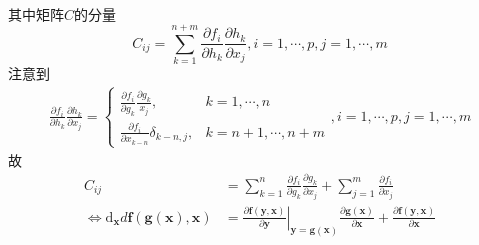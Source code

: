 \documentclass[main.tex]{subfiles}
\begin{document}
\begin{example}
\begin{align*}
    \end{align*}
    其中矩阵$C$的分量
    \[
        C_{ij}=\sum_{k=1}^{n+m}\frac{\partial f_i}{\partial h_k}\frac{\partial h_k}{\partial x_j},i=1,\cdots,p,j=1,\cdots,m
    \]
    注意到
    \begin{align*}
        \frac{\partial f_i}{\partial h_k}\frac{\partial h_k}{\partial x_j}=\left\{\begin{array}{ll}
                                                                                      \frac{\partial f_i}{\partial g_k}\frac{\partial g_k}{x_j}, & k=1,\cdots,n     \\
                                                                                      \frac{\partial f_i}{\partial x_{k-n}}\delta_{k-n,j},       & k=n+1,\cdots,n+m
                                                                                  \end{array}\right.,i=1,\cdots,p,j=1,\cdots,m
    \end{align*}
    故
    \begin{align*}
        C_{ij}                                                                                                     & =\sum_{k=1}^{n}\frac{\partial f_i}{\partial g_k}\frac{\partial g_k}{\partial x_j}+\sum_{j=1}^m\frac{\partial f_i}{\partial x_j}                                                                                                                                                                      \\
        \Leftrightarrow\mathrm{d}_{\mathbf{x}}d\mathbf{f}\left(\mathbf{g}\left(\mathbf{x}\right),\mathbf{x}\right) & =\left.\frac{\partial \mathbf{f}\left(\mathbf{y},\mathbf{x}\right)}{\partial \mathbf{y}}\right|_{\mathbf{y}=\mathbf{g}\left(\mathbf{x}\right)}\frac{\partial\mathbf{g}\left(\mathbf{x}\right)}{\partial \mathbf{x}}+\frac{\partial \mathbf{f}\left(\mathbf{y},\mathbf{x}\right)}{\partial\mathbf{x}}
    \end{align*}
\end{example}
\end{document}
